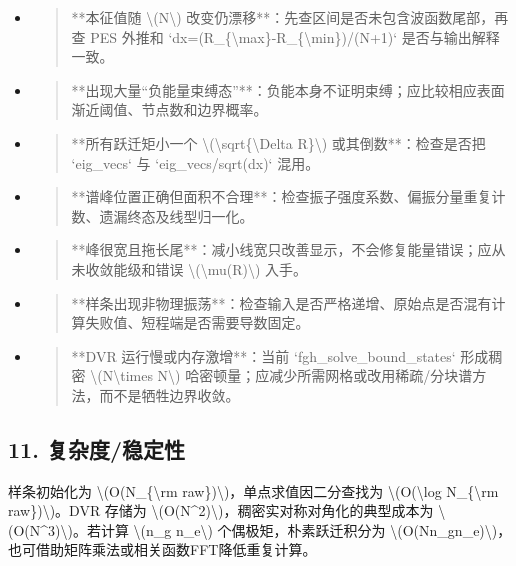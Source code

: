 \documentclass[UTF8,openany,11pt,fontset=fandol]{ctexbook}
\begin{document}
\begin{itemize}
\item
  \begin{quote}
  **本征值随 \textbackslash(N\textbackslash)
  改变仍漂移**：先查区间是否未包含波函数尾部，再查 PES 外推和
  `dx=(R\_\{\textbackslash max\}-R\_\{\textbackslash min\})/(N+1)`
  是否与输出解释一致。
  \end{quote}
\item
  \begin{quote}
  **出现大量``负能量束缚态''**：负能本身不证明束缚；应比较相应表面渐近阈值、节点数和边界概率。
  \end{quote}
\item
  \begin{quote}
  **所有跃迁矩小一个
  \textbackslash(\textbackslash sqrt\{\textbackslash Delta
  R\}\textbackslash) 或其倒数**：检查是否把 `eig\_vecs` 与
  `eig\_vecs/sqrt(dx)` 混用。
  \end{quote}
\item
  \begin{quote}
  **谱峰位置正确但面积不合理**：检查振子强度系数、偏振分量重复计数、遗漏终态及线型归一化。
  \end{quote}
\item
  \begin{quote}
  **峰很宽且拖长尾**：减小线宽只改善显示，不会修复能量错误；应从未收敛能级和错误
  \textbackslash(\textbackslash mu(R)\textbackslash) 入手。
  \end{quote}
\item
  \begin{quote}
  **样条出现非物理振荡**：检查输入是否严格递增、原始点是否混有计算失败值、短程端是否需要导数固定。
  \end{quote}
\item
  \begin{quote}
  **DVR 运行慢或内存激增**：当前 `fgh\_solve\_bound\_states` 形成稠密
  \textbackslash(N\textbackslash times N\textbackslash)
  哈密顿量；应减少所需网格或改用稀疏/分块谱方法，而不是牺牲边界收敛。
  \end{quote}
\end{itemize}

\subsection{\texorpdfstring{\textbf{11.
复杂度/稳定性}}{11. 复杂度/稳定性}}\label{ux590dux6742ux5ea6ux7a33ux5b9aux6027}

样条初始化为 \textbackslash(O(N\_\{\textbackslash rm
raw\})\textbackslash)，单点求值因二分查找为
\textbackslash(O(\textbackslash log N\_\{\textbackslash rm
raw\})\textbackslash)。DVR 存储为
\textbackslash(O(N\^{}2)\textbackslash)，稠密实对称对角化的典型成本为
\textbackslash(O(N\^{}3)\textbackslash)。若计算 \textbackslash(n\_g
n\_e\textbackslash) 个偶极矩，朴素跃迁积分为
\textbackslash(O(Nn\_gn\_e)\textbackslash)，也可借助矩阵乘法或相关函数FFT降低重复计算。
\end{document}
